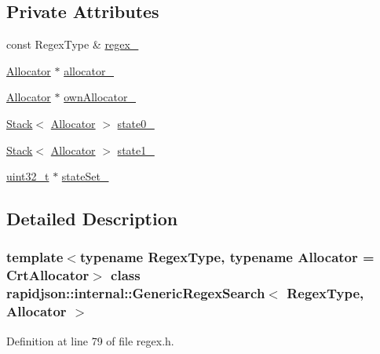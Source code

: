 \subsection*{Private Attributes}
\begin{DoxyCompactItemize}
\item 
const Regex\+Type \& \mbox{\hyperlink{classrapidjson_1_1internal_1_1_generic_regex_search_a5b5f8158636862e5478cc22557756973}{regex\+\_\+}}
\item 
\mbox{\hyperlink{classrapidjson_1_1_allocator}{Allocator}} $\ast$ \mbox{\hyperlink{classrapidjson_1_1internal_1_1_generic_regex_search_af1f9de9000f67cbdb83946f9ec63337f}{allocator\+\_\+}}
\item 
\mbox{\hyperlink{classrapidjson_1_1_allocator}{Allocator}} $\ast$ \mbox{\hyperlink{classrapidjson_1_1internal_1_1_generic_regex_search_a87eb3f0c90ca51aace1a58106a585086}{own\+Allocator\+\_\+}}
\item 
\mbox{\hyperlink{classrapidjson_1_1internal_1_1_stack}{Stack}}$<$ \mbox{\hyperlink{classrapidjson_1_1_allocator}{Allocator}} $>$ \mbox{\hyperlink{classrapidjson_1_1internal_1_1_generic_regex_search_ac47140455dfa6fbc2dd0c1112dea363b}{state0\+\_\+}}
\item 
\mbox{\hyperlink{classrapidjson_1_1internal_1_1_stack}{Stack}}$<$ \mbox{\hyperlink{classrapidjson_1_1_allocator}{Allocator}} $>$ \mbox{\hyperlink{classrapidjson_1_1internal_1_1_generic_regex_search_a0eebdb0e441243c38a85b7e44313ca92}{state1\+\_\+}}
\item 
\mbox{\hyperlink{stdint_8h_a435d1572bf3f880d55459d9805097f62}{uint32\+\_\+t}} $\ast$ \mbox{\hyperlink{classrapidjson_1_1internal_1_1_generic_regex_search_a13721765fd14d32048c63b12bff5e005}{state\+Set\+\_\+}}
\end{DoxyCompactItemize}


\subsection{Detailed Description}
\subsubsection*{template$<$typename Regex\+Type, typename Allocator = Crt\+Allocator$>$\newline
class rapidjson\+::internal\+::\+Generic\+Regex\+Search$<$ Regex\+Type, Allocator $>$}



Definition at line 79 of file regex.\+h.



